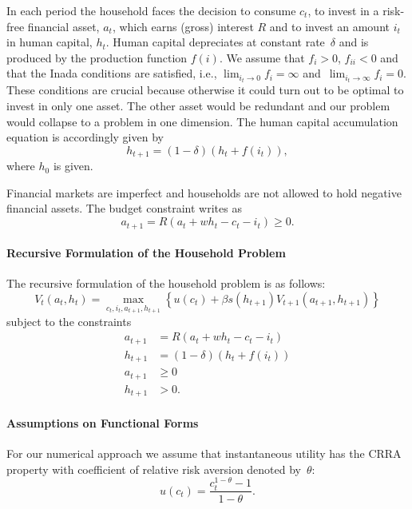 \documentclass[a4paper,12pt]{article}%
\begin{document}
In each period the household faces the decision to consume $c_{t}$, to invest in a risk-free financial asset, $a_{t}$, which earns (gross) interest $R$ and to invest an amount $i_{t}$ in human capital, $h_{t}$. Human capital depreciates at constant rate~$\delta$ and is produced by the production function $f\left( i\right)$. We assume that $f_{i}>0$, $f_{ii}<0$ and that the Inada conditions are satisfied, i.e., $\lim_{i_{t}\rightarrow0}f_{i}=\infty$ and~$\lim_{i_{t}\rightarrow\infty}f_{i}=0$. These conditions are crucial because otherwise it could turn out to be optimal to invest in only one asset. The other asset would be redundant and our problem would collapse to a problem in one dimension. The human capital accumulation equation is
accordingly given by
\begin{equation}
h_{t+1}=(1-\delta)\left( h_{t}+f\left( i_{t}\right) \right),
\label{eq:hkaccum}
\end{equation}
where $h_{0}$ is given.

Financial markets are imperfect and households are not allowed to hold negative financial assets. The budget constraint writes as
\[
a_{t+1} = R(a_{t} + w h_{t} - c_{t} - i_{t}) \geq0.
\]

\paragraph{Recursive Formulation of the Household Problem}

The recursive formulation of the household problem is as follows:
\[
V_{t}(a_{t},h_{t})=\underset{c_{t},i_{t},a_{t+1},h_{t+1}}{\max}\left\{u(c_{t})+\beta s\left(  h_{t+1}\right)  V_{t+1}(a_{t+1},h_{t+1})\right\}
\]
subject to the constraints
\begin{align}
a_{t+1}  &  =R\left(  a_{t}+wh_{t}-c_{t}-i_{t}\right) \nonumber\\
h_{t+1}  &  =\left(  1-\delta\right)  \left(  h_{t}+f\left(  i_{t}\right)\right) \nonumber\\
a_{t+1}  &  \geq0\nonumber\\
h_{t+1}  &  >0. \label{eq:hinequ}
\end{align}

\paragraph{Assumptions on Functional Forms}

For our numerical approach we assume that instantaneous utility has the CRRA property with coefficient of relative risk aversion denoted by~$\theta$:
\[
u\left( c_{t}\right) =\frac{c_{t}^{1-\theta}-1}{1-\theta}.
\]
\end{document}
